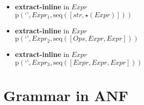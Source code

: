 {\begin{itemize}
\item \textbf{extract-inline}  in $\mathit{Expr}$\\$\mathrm{p}\left(\text{`'},\mathit{Expr_1},\mathrm{seq}\left(\left[str, \star \left(\mathit{Expr}\right)\right]\right)\right)$
\item \textbf{extract-inline}  in $\mathit{Expr}$\\$\mathrm{p}\left(\text{`'},\mathit{Expr_2},\mathrm{seq}\left(\left[\mathit{Ops}, \mathit{Expr}, \mathit{Expr}\right]\right)\right)$
\item \textbf{extract-inline}  in $\mathit{Expr}$\\$\mathrm{p}\left(\text{`'},\mathit{Expr_3},\mathrm{seq}\left(\left[\mathit{Expr}, \mathit{Expr}, \mathit{Expr}\right]\right)\right)$
\end{itemize}}

\section{Grammar in ANF}

